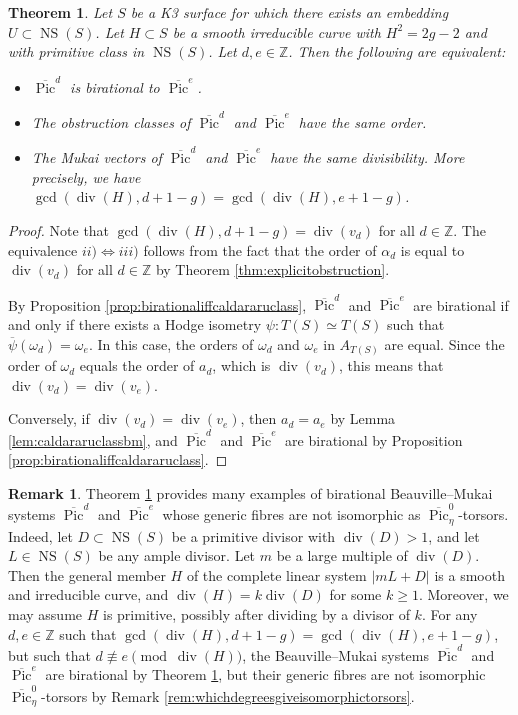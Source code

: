 \documentclass[11pt,twoside]{amsart}
\numberwithin{equation}{section}
\newtheorem{theorem}[dummy]{Theorem}
\theoremstyle{definition}
\newtheorem{remark}[dummy]{Remark}
\theoremstyle{plain}
\newcommand{\Z}{\ensuremath{\mathbb{Z}}}
\def\NS{\operatorname{NS}}
\def\olPic{\overline{\operatorname{Pic}}}
\def\dv{\operatorname{div}}
\begin{document}
\begin{theorem}\label{thm:birationalequivalencebeauville--mukaioverelliptick3surfaces}
    Let $S$ be a K3 surface for which there exists an embedding $U\subset \NS(S)$. Let $H\subset S$ be a smooth irreducible curve with $H^2 = 2g-2$ and with primitive class in $\NS(S)$. Let $d,e\in \Z$. Then the following are equivalent:
    \begin{itemize}
        \item[i)] $\olPic^d$ is birational to $\olPic^e$.
        \item[ii)] The obstruction classes of $\olPic^d$ and $\olPic^e$ have the same order. 
        \item[iii)] The Mukai vectors of $\olPic^d$ and $\olPic^e$ have the same divisibility. More precisely, we have $\gcd(\dv(H),d+1-g) = \gcd(\dv(H),e+1-g)$.
    \end{itemize}    
\end{theorem}
\begin{proof}
    Note that $\gcd(\dv(H),d+1-g)=\dv(v_d)$ for all $d\in \Z$.
    The equivalence $ii)\iff iii)$ follows from the fact that the order of $\alpha_d$ is equal to $\dv(v_d)$ for all $d\in \Z$ by Theorem \ref{thm:explicitobstruction}. 
    
    By Proposition \ref{prop:birationaliffcaldararuclass}, $\olPic^d$ and $\olPic^e$ are birational if and only if there exists a Hodge isometry $\psi:T(S)\simeq T(S)$ such that $\overline{\psi}(\omega_d) = \omega_e$. In this case, the orders of $\omega_d$ and $\omega_e$ in $A_{T(S)}$ are equal. Since the order of $\omega_d$ equals the order of $a_d$, which is $\dv(v_d)$, this means that $\dv(v_d) = \dv(v_e)$.
    
    Conversely, if $\dv(v_d)=\dv(v_e)$, then $a_d = a_e$ by Lemma \ref{lem:caldararuclassbm}, and $\olPic^d$ and $\olPic^e$ are birational by Proposition \ref{prop:birationaliffcaldararuclass}.
\end{proof}




\begin{remark}
    Theorem \ref{thm:birationalequivalencebeauville--mukaioverelliptick3surfaces} provides many examples of birational Beauville--Mukai systems $\olPic^d$ and $\olPic^e$ whose generic fibres are not isomorphic as $\olPic^0_\eta$-torsors. Indeed, let $D\subset \NS(S)$ be a primitive divisor with $\dv(D)>1$, and let $L\in \NS(S)$ be any ample divisor. Let $m$ be a large multiple of $\dv(D)$. Then the general member $H$ of the complete linear system $|mL + D|$ is a smooth and irreducible curve, and $\dv(H) = k\dv(D)$ for some $k\geq 1$. Moreover, we may assume $H$ is primitive, possibly after dividing by a divisor of $k$. For any $d,e\in \Z$ such that $\gcd(\dv(H),d+1-g)=\gcd(\dv(H),e+1-g)$, but such that $d\not\equiv e\pmod{\dv(H)}$, the Beauville--Mukai systems $\olPic^d$ and $\olPic^e$ are birational by Theorem \ref{thm:birationalequivalencebeauville--mukaioverelliptick3surfaces}, but their generic fibres are not isomorphic $\olPic^0_\eta$-torsors by Remark \ref{rem:whichdegreesgiveisomorphictorsors}.
\end{remark}
\end{document}
